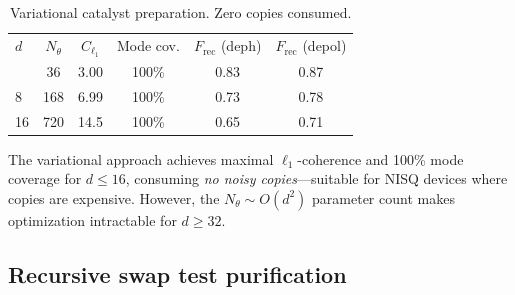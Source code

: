 \documentclass[prx,twocolumn,superscriptaddress,longbibliography,floatfix]{revtex4-2}
\begin{document}
\begin{table}[tb]
\caption{Variational catalyst preparation. Zero copies consumed.}
\label{tab:variational}
\begin{ruledtabular}
\begin{tabular}{lccccc}
$d$ & $N_\theta$ & $C_{\ell_1}$ & Mode cov. & $F_\mathrm{rec}$ (deph) & $F_\mathrm{rec}$ (depol) \\
\colrule
4 & 36 & 3.00 & 100\% & 0.83 & 0.87 \\
8 & 168 & 6.99 & 100\% & 0.73 & 0.78 \\
16 & 720 & 14.5 & 100\% & 0.65 & 0.71 \\
\end{tabular}
\end{ruledtabular}
\end{table}

The variational approach achieves maximal $\ell_1$-coherence and 100\% mode coverage for $d \leq 16$, consuming \emph{no noisy copies}---suitable for NISQ devices where copies are expensive.
However, the $N_\theta \sim O(d^2)$ parameter count makes optimization intractable for $d \geq 32$.


\subsection{Recursive swap test purification}
\label{sec:swap_test}
\end{document}
